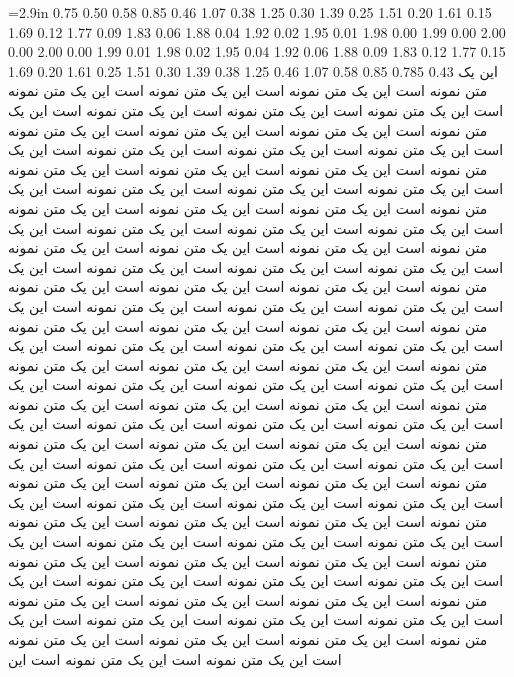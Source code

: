 \documentclass{minimal}
\begin{document}
 =2.9in \parindent0pt
  0.75   0.50
  0.58   0.85
  0.46   1.07
  0.38   1.25
  0.30   1.39
  0.25   1.51
  0.20   1.61
  0.15   1.69
  0.12   1.77
  0.09   1.83
  0.06   1.88
  0.04   1.92
  0.02   1.95
  0.01   1.98
  0.00   1.99
  0.00   2.00
  0.00   2.00
  0.00   1.99
  0.01   1.98
  0.02   1.95
  0.04   1.92
  0.06   1.88
  0.09   1.83
  0.12   1.77
  0.15   1.69
  0.20   1.61
  0.25   1.51
  0.30   1.39
  0.38   1.25
  0.46   1.07
  0.58   0.85
  0.785   0.43
\baselineskip=12.5pt
\parfillskip=0pt
این یک متن نمونه است  این یک متن نمونه است این یک متن نمونه است این یک متن نمونه است این یک متن نمونه است این یک متن نمونه است این یک متن نمونه است این یک متن نمونه است این یک متن نمونه است این یک متن نمونه است این یک متن نمونه است این یک متن نمونه است این یک متن نمونه است این یک متن نمونه است این یک متن نمونه است این یک متن نمونه است این یک متن نمونه است این یک متن نمونه است این یک متن نمونه است این یک متن نمونه است این یک متن نمونه است این یک متن نمونه است این یک متن نمونه است این یک متن نمونه است این یک متن نمونه است این یک متن نمونه است این یک متن نمونه است 
این یک متن نمونه است  این یک متن نمونه است این یک متن نمونه است این یک متن نمونه است این یک متن نمونه است این یک متن نمونه است این یک متن نمونه است این یک متن نمونه است این یک متن نمونه است این یک متن نمونه است این یک متن نمونه است این یک متن نمونه است این یک متن نمونه است این یک متن نمونه است این یک متن نمونه است این یک متن نمونه است این یک متن نمونه است این یک متن نمونه است این یک متن نمونه است این یک متن نمونه است این یک متن نمونه است این یک متن نمونه است این یک متن نمونه است این یک متن نمونه است این یک متن نمونه است این یک متن نمونه است این یک متن نمونه است 
این یک متن نمونه است  این یک متن نمونه است این یک متن نمونه است این یک متن نمونه است این یک متن نمونه است این یک متن نمونه است این یک متن نمونه است این یک متن نمونه است این یک متن نمونه است این یک متن نمونه است این یک متن نمونه است این یک متن نمونه است این یک متن نمونه است این یک متن نمونه است این یک متن نمونه است این یک متن نمونه است این یک متن نمونه است این یک متن نمونه است این یک متن نمونه است این یک متن نمونه است این یک متن نمونه است این یک متن نمونه است این یک متن نمونه است این یک متن نمونه است این یک متن نمونه است این یک متن نمونه است این یک متن نمونه است 
این یک متن نمونه است  این یک متن نمونه است این یک متن نمونه است این یک متن نمونه است این یک متن نمونه است این یک متن نمونه است این یک متن نمونه است این یک متن نمونه است این یک متن نمونه است این یک متن نمونه است این یک متن نمونه است این یک متن نمونه است این یک متن نمونه است این یک متن نمونه است این یک متن نمونه است این یک متن نمونه است این یک متن نمونه است این یک متن نمونه است این یک متن نمونه است این یک متن نمونه است این یک متن نمونه است این یک متن نمونه است این یک متن نمونه است این 

\vfill
\end{document}
